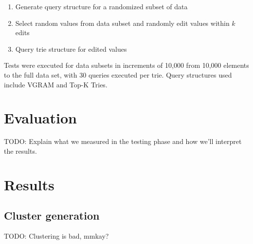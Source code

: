 \documentclass[pdftex,12pt,letter]{article}
\begin{document}
\begin{enumerate}
\item Generate query structure for a randomized subset of data
\item Select random values from data subset and randomly edit values within $k$ edits
\item Query trie structure for edited values
\end{enumerate}

Tests were executed for data subsets in increments of 10,000 from 10,000 elements to the full data set, with 30 queries executed per trie. Query structures used include VGRAM and Top-K Tries.

\section{Evaluation}
TODO: Explain what we measured in the testing phase and how we'll interpret the results.

\newpage
\section{Results}
\subsection{Cluster generation}
TODO: Clustering is bad, mmkay?
\end{document}
